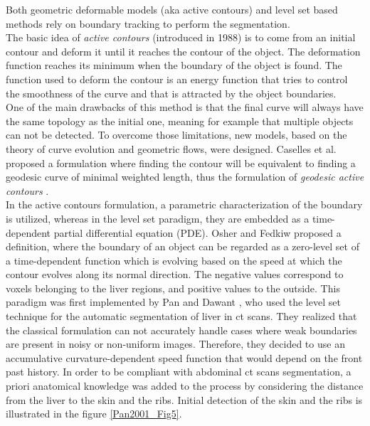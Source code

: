 Both geometric deformable models (aka active contours) and level set
based methods rely on boundary tracking to perform the segmentation.\\
The basic idea of \emph{active contours} (introduced in 1988) is to
come from an initial contour and deform it until it reaches the
contour of the object. The deformation function reaches its minimum when
the boundary of the object is found. The function used to deform the
contour is an energy function that tries to control the smoothness of
the curve and that is attracted by the object boundaries.\\
One of the main drawbacks of this method is that the final curve will
always have the same topology as the initial one, meaning for example
that multiple objects can not be detected. To overcome those limitations,
new models, based on the theory of curve evolution and geometric flows,
were designed.
Caselles et al. \cite{Caselles1997} proposed a formulation where finding the contour will be
equivalent to finding a geodesic curve of minimal weighted length, thus
the formulation of \emph{geodesic active contours} .\\
In the active contours formulation, a parametric characterization of the
boundary is utilized, whereas in the level set paradigm, they are
embedded as a time-dependent partial differential equation (PDE).
Osher and Fedkiw \cite{Osher2003} proposed a definition, where the boundary of an object
can be regarded as a zero-level set of a time-dependent function which
is evolving based on the speed at which the contour evolves along its
normal direction. The negative values correspond to voxels belonging to
the liver regions, and positive values to the outside. This paradigm was
first implemented by
Pan and Dawant \cite{Pan2001}, who used the level set technique for the automatic segmentation of liver
in \ac{ct} scans. They realized that the classical formulation can not
accurately handle cases where weak boundaries are present in noisy or
non-uniform images. Therefore, they decided to use an accumulative
curvature-dependent speed function that would depend on the front past
history. In order to be compliant with abdominal \ac{ct} scans segmentation,
a priori anatomical knowledge was added to the process by considering
the distance from the liver to the skin and the ribs. Initial detection
of the skin and the ribs is illustrated in the figure \ref{Pan2001_Fig5}.

